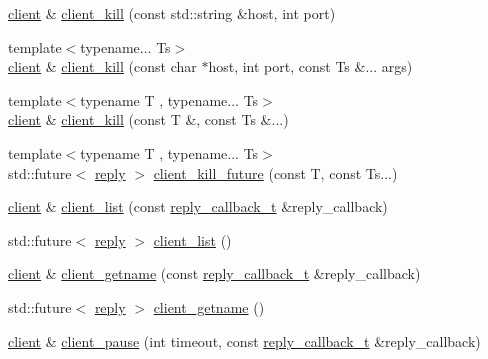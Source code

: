 \begin{DoxyCompactItemize}
\item 
\hyperlink{classcpp__redis_1_1client}{client} \& \hyperlink{classcpp__redis_1_1client_a3163e1f29d65a5e7b0d4165be154fb96}{client\+\_\+kill} (const std\+::string \&host, int port)
\item 
{\footnotesize template$<$typename... Ts$>$ }\\\hyperlink{classcpp__redis_1_1client}{client} \& \hyperlink{classcpp__redis_1_1client_a38df8e614a5ac9533a1993b7dec7be6b}{client\+\_\+kill} (const char $\ast$host, int port, const Ts \&... args)
\item 
{\footnotesize template$<$typename T , typename... Ts$>$ }\\\hyperlink{classcpp__redis_1_1client}{client} \& \hyperlink{classcpp__redis_1_1client_a1e2dd6cdcdb4307ceda0f866fe0a154f}{client\+\_\+kill} (const T \&, const Ts \&...)
\item 
{\footnotesize template$<$typename T , typename... Ts$>$ }\\std\+::future$<$ \hyperlink{classcpp__redis_1_1reply}{reply} $>$ \hyperlink{classcpp__redis_1_1client_ae6f09b6c022c910b79fb90a47291f511}{client\+\_\+kill\+\_\+future} (const T, const Ts...)
\item 
\hyperlink{classcpp__redis_1_1client}{client} \& \hyperlink{classcpp__redis_1_1client_a9c2e307ab54f42ce50bdd42e1c6a363b}{client\+\_\+list} (const \hyperlink{classcpp__redis_1_1client_a061a1140d36d2eaeda82b09a0bb3f9f2}{reply\+\_\+callback\+\_\+t} \&reply\+\_\+callback)
\item 
std\+::future$<$ \hyperlink{classcpp__redis_1_1reply}{reply} $>$ \hyperlink{classcpp__redis_1_1client_a0480140cc584e6dd2a0a6fab9da10cc5}{client\+\_\+list} ()
\item 
\hyperlink{classcpp__redis_1_1client}{client} \& \hyperlink{classcpp__redis_1_1client_ac4e058eaa75eb04c7a8017a779d5015e}{client\+\_\+getname} (const \hyperlink{classcpp__redis_1_1client_a061a1140d36d2eaeda82b09a0bb3f9f2}{reply\+\_\+callback\+\_\+t} \&reply\+\_\+callback)
\item 
std\+::future$<$ \hyperlink{classcpp__redis_1_1reply}{reply} $>$ \hyperlink{classcpp__redis_1_1client_a89068e68b418906e9e34cb9a95f7a179}{client\+\_\+getname} ()
\item 
\hyperlink{classcpp__redis_1_1client}{client} \& \hyperlink{classcpp__redis_1_1client_acdf001d60d1d82d3f090b7c679e3183e}{client\+\_\+pause} (int timeout, const \hyperlink{classcpp__redis_1_1client_a061a1140d36d2eaeda82b09a0bb3f9f2}{reply\+\_\+callback\+\_\+t} \&reply\+\_\+callback)
\item 

\end{DoxyCompactItemize}
